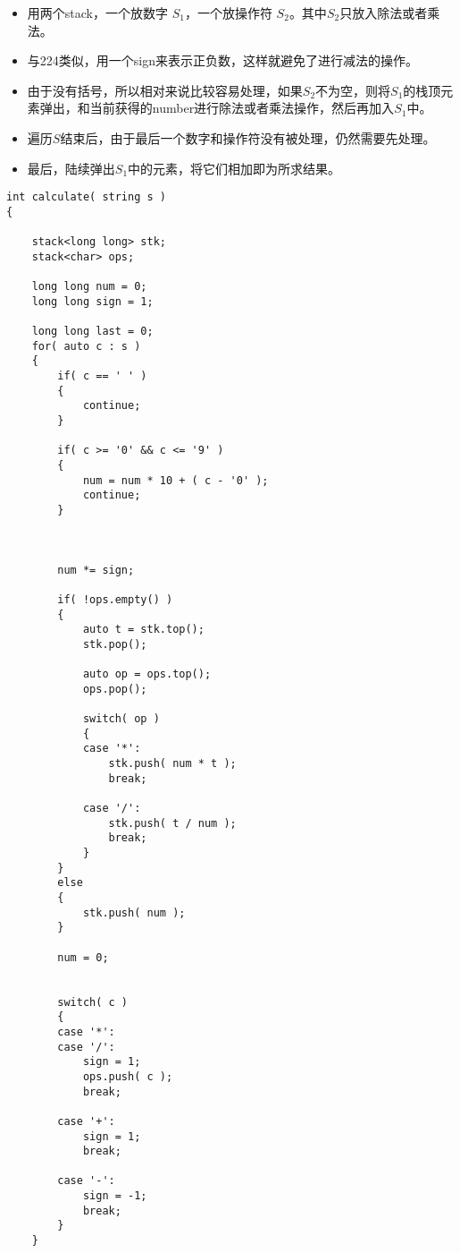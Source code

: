\begin{itemize}
\item 用两个stack，一个放数字 $S_1$，一个放操作符 $S_2$。其中$S_2$只放入除法或者乘法。
\item 与224类似，用一个sign来表示正负数，这样就避免了进行减法的操作。
\item 由于没有括号，所以相对来说比较容易处理，如果$S_2$不为空，则将$S_1$的栈顶元素弹出，和当前获得的number进行除法或者乘法操作，然后再加入$S_1$中。
\item 遍历$S$结束后，由于最后一个数字和操作符没有被处理，仍然需要先处理。
\item 最后，陆续弹出$S_1$中的元素，将它们相加即为所求结果。
\end{itemize}


\setcounter{lstlisting}{0}
\begin{lstlisting}[style=customc, caption={Two Stacks}]
int calculate( string s )
{

    stack<long long> stk;
    stack<char> ops;

    long long num = 0;
    long long sign = 1;

    long long last = 0;
    for( auto c : s )
    {
        if( c == ' ' )
        {
            continue;
        }

        if( c >= '0' && c <= '9' )
        {
            num = num * 10 + ( c - '0' );
            continue;
        }



        num *= sign;

        if( !ops.empty() )
        {
            auto t = stk.top();
            stk.pop();

            auto op = ops.top();
            ops.pop();

            switch( op )
            {
            case '*':
                stk.push( num * t );
                break;

            case '/':
                stk.push( t / num );
                break;
            }
        }
        else
        {
            stk.push( num );
        }

        num = 0;


        switch( c )
        {
        case '*':
        case '/':
            sign = 1;
            ops.push( c );
            break;

        case '+':
            sign = 1;
            break;

        case '-':
            sign = -1;
            break;
        }
    }


\end{lstlisting}
